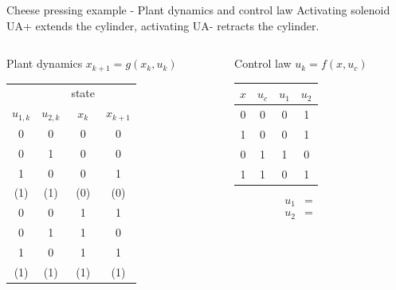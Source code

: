 \documentclass[presentation,aspectratio=1610]{beamer}
\begin{document}
\begin{frame}[label={sec:orgd7c64fa}]{Cheese pressing example - Plant dynamics and control law}
Activating solenoid UA+ extends the cylinder, activating  UA- retracts the cylinder.
\begin{columns}
\begin{column}{0.5\columnwidth}
\begin{block}{Plant dynamics \(x_{k+1} = g(x_k, u_k)\)}
\begin{center}
\begin{tabular}{|cc|cc|}
\hline
 &  & state & \\
\(u_{1,k}\) & \(u_{2,k}\) & \(x_k\) & \(x_{k+1}\)\\
\hline
0 & 0 & 0 & 0\\
0 & 1 & 0 & 0\\
1 & 0 & 0 & 1\\
(1) & (1) & (0) & (0)\\
0 & 0 & 1 & 1\\
0 & 1 & 1 & 0\\
1 & 0 & 1 & 1\\
(1) & (1) & (1) & (1)\\
\hline
\end{tabular}
\end{center}
\end{block}
\end{column}

\begin{column}{0.5\columnwidth}
\begin{block}{Control law \(u_k = f(x, u_c)\)}
\begin{center}
\begin{tabular}{|cc|cc|}
\hline
\(x\) & \(u_{c}\) & \(u_1\) & \(u_2\)\\
\hline
0 & 0 & 0 & 1\\
1 & 0 & 0 & 1\\
0 & 1 & 1 & 0\\
1 & 1 & 0 & 1\\
\hline
\end{tabular}
\end{center}

\begin{align*}
  u_1 &= \qquad\qquad\\
  u_2 &= 
\end{align*}
\end{block}
\end{column}
\end{columns}
\end{frame}
\end{document}

